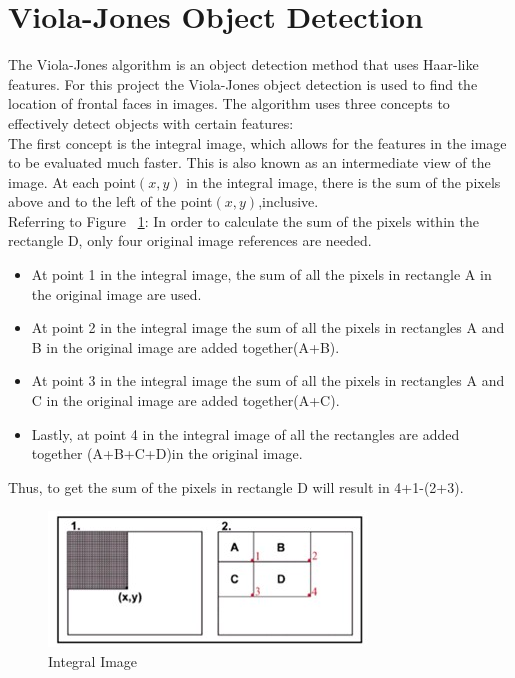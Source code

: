 \section{Viola-Jones Object Detection}
\begin{flushleft}
The Viola-Jones algorithm \citep{viola} is an object detection method that uses Haar-like features. For this project the Viola-Jones object detection is used to find the location of frontal faces in images. The algorithm uses three concepts to effectively detect objects with certain features:\\

The first concept is the integral image, which allows for the features in the image to be evaluated much faster. This is also known as an intermediate view of the image. At each point$(x,y)$ in the integral image, there is the sum of the pixels above and to the left of the point$(x,y)$,inclusive.\\
Referring to Figure ~\ref{fig: integral}:
In order to calculate the sum of the pixels within the rectangle D, only four original  image references are needed.

\begin{itemize}
\item At point 1 in the integral image, the sum of all the pixels in rectangle A in the original image are used. 
\item At point 2 in the integral image the sum of all the pixels in rectangles A and B in the original image are added together(A+B). 
\item At point 3 in the integral image the sum of all the pixels in rectangles A and C in the original image are added together(A+C). 
\item Lastly, at point 4 in the integral image of all the rectangles are added together (A+B+C+D)in the original image. 
\end{itemize}
Thus, to get the sum of the pixels in rectangle D will result in 4+1-(2+3).
\end{flushleft}
\begin{figure}[H]
  \centering
  \includegraphics[scale=0.8]{1}
  \caption{Integral Image\citep{viola}}
  \label{fig: integral}
\end{figure}
